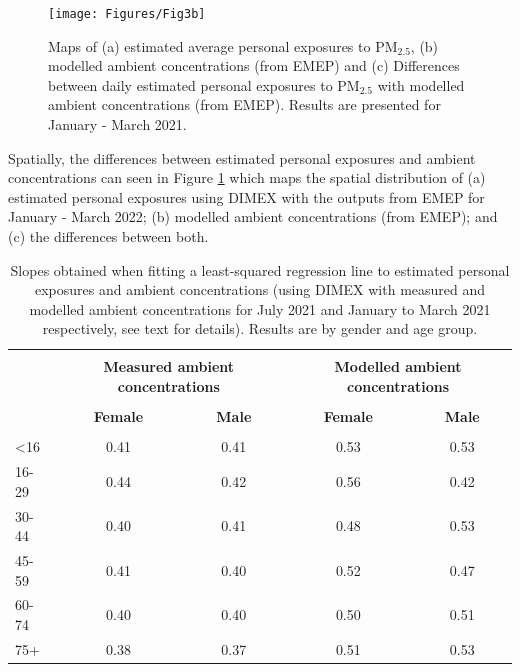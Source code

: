 \documentclass{article}
\begin{document}
\begin{figure}[t]
	\centering
	\texttt{[image: Figures/Fig3b]}		
	\caption{Maps of (a) estimated average personal exposures to PM$_{2.5}$, (b) modelled ambient concentrations (from EMEP) and (c) Differences between daily estimated personal exposures to PM$_{2.5}$ with modelled ambient concentrations (from EMEP). Results are presented for January - March 2021.} \label{fig::Fig3b}
\end{figure}

\noindent Spatially, the differences between estimated personal exposures and ambient concentrations can seen in Figure \ref{fig::Fig3b} which maps the spatial distribution of (a) estimated personal exposures using DIMEX with the outputs from EMEP for January  - March 2022; (b) modelled ambient concentrations (from EMEP); and (c) the differences between both.\\

\begin{table}
    \centering
    \caption{Slopes obtained when fitting a least-squared regression line to estimated personal exposures and ambient concentrations (using DIMEX with measured and modelled ambient concentrations for July 2021 and January to March 2021 respectively, see text for details). Results are by gender and age group.} \label{tab::slopes}
    \begin{tabular}{l c ccc}
        \hline \hline \\[-8pt]
         & \multicolumn{2}{c}{\textbf{Measured ambient concentrations}} & \multicolumn{2}{c}{\textbf{Modelled ambient concentrations}} \\
          \cmidrule(lr){2-3}  \cmidrule(lr){4-5}\\[-10pt]
         & \textbf{Female} & \textbf{Male} & \textbf{Female} & \textbf{Male} \\
         \hline\\[-8pt]
        <16   & 0.41 & 0.41 & 0.53 & 0.53\\
        16-29 & 0.44 & 0.42 & 0.56 & 0.42\\
        30-44 & 0.40 & 0.41 & 0.48 & 0.53\\
        45-59 & 0.41 & 0.40 & 0.52 & 0.47\\
        60-74 & 0.40 & 0.40 & 0.50 & 0.51\\
        75+   & 0.38 & 0.37 & 0.51 & 0.53\\[3pt]
        \hline \hline
    \end{tabular}
\end{table}
\end{document}
